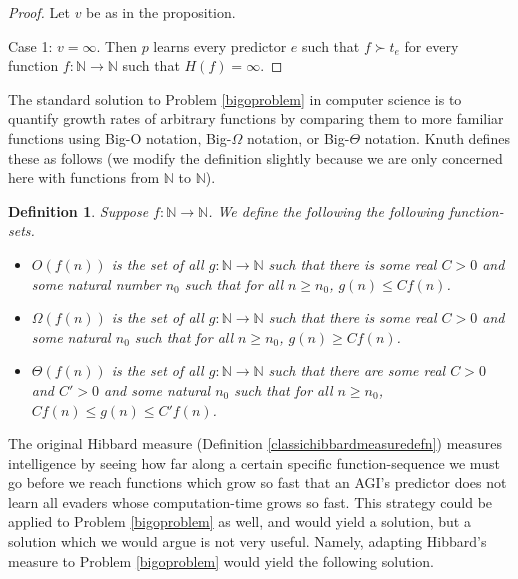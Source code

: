 \documentclass{article}
\newtheorem{definition}[theorem]{Definition}
\begin{document}
\begin{proof}
    Let $v$ be as in the proposition.

    Case 1: $v=\infty$. Then $p$ learns every predictor $e$ such that
    $f\succ t_e$ for every function $f:\mathbb N\to\mathbb N$ such that
    $H(f)=\infty$. 
\end{proof}

The standard solution to Problem \ref{bigoproblem} in computer science is to quantify
growth rates of arbitrary functions by comparing them to more familiar functions using
Big-O notation, Big-$\Omega$ notation, or Big-$\Theta$ notation.
Knuth defines \cite{knuth1976big} these as follows (we modify the definition slightly because
we are only concerned here with functions from $\mathbb N$ to $\mathbb N$).

\begin{definition}
\label{bigodefn}
    Suppose $f:\mathbb N\to\mathbb N$. We define the following the following function-sets.
    \begin{itemize}
        \item
        $O(f(n))$ is the set of all $g:\mathbb N\to\mathbb N$ such that
        there is some real $C>0$ and some natural number $n_0$ such that
        for all $n\geq n_0$, $g(n)\leq Cf(n)$.
        \item
        $\Omega(f(n))$ is the set of all $g:\mathbb N\to\mathbb N$ such that
        there is some real $C>0$ and some natural $n_0$ such that
        for all $n\geq n_0$, $g(n)\geq Cf(n)$.
        \item
        $\Theta(f(n))$ is the set of all $g:\mathbb N\to\mathbb N$ such that
        there are some real $C>0$ and $C'>0$ and some natural $n_0$ such that
        for all $n\geq n_0$, $Cf(n)\leq g(n)\leq C'f(n)$.
    \end{itemize}
\end{definition}



The original Hibbard measure (Definition \ref{classichibbardmeasuredefn}) measures
intelligence by seeing how far along a certain specific function-sequence we must go
before we reach functions which grow so fast that an AGI's predictor does not learn
all evaders whose computation-time grows so fast. This strategy could be applied to
Problem \ref{bigoproblem} as well, and would yield a solution, but a solution which we
would argue is not very useful. Namely, adapting Hibbard's measure to
Problem \ref{bigoproblem} would yield the following solution.
\end{document}
